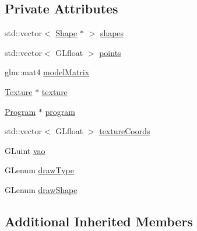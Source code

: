 \subsection*{Private Attributes}
\begin{DoxyCompactItemize}
\item 
std\+::vector$<$ \hyperlink{class_g_g_e_1_1_shape}{Shape} $\ast$ $>$ \hyperlink{class_g_g_e_1_1_mesh_a47f9d96f13ba1a491de0bd3c3adb9a76}{shapes}
\item 
std\+::vector$<$ G\+Lfloat $>$ \hyperlink{class_g_g_e_1_1_mesh_ab91ef29f57f9f8b7cddb7f360da63f47}{points}
\item 
glm\+::mat4 \hyperlink{class_g_g_e_1_1_mesh_a8ec6ca9082c5573198be3e9d675c2e92}{model\+Matrix}
\item 
\hyperlink{class_g_g_e_1_1_texture}{Texture} $\ast$ \hyperlink{class_g_g_e_1_1_mesh_acda1261106fd88be1bfc6a9adaa0e7b5}{texture}
\item 
\hyperlink{class_g_g_e_1_1_program}{Program} $\ast$ \hyperlink{class_g_g_e_1_1_mesh_aee3bd238788ee7380e8d6770d5f29f2c}{program}
\item 
std\+::vector$<$ G\+Lfloat $>$ \hyperlink{class_g_g_e_1_1_mesh_a7e48e26708078727065dd68e58846503}{texture\+Coords}
\item 
G\+Luint \hyperlink{class_g_g_e_1_1_mesh_a547c5fcf688b6a957c3febd742d51f9f}{vao}
\item 
G\+Lenum \hyperlink{class_g_g_e_1_1_mesh_a92c516168dc3400a468cd4dd632287f6}{draw\+Type}
\item 
G\+Lenum \hyperlink{class_g_g_e_1_1_mesh_a31f188bc943c5586befddc8838bd7c9a}{draw\+Shape}
\end{DoxyCompactItemize}
\subsection*{Additional Inherited Members}


